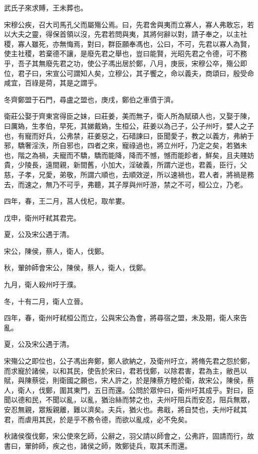 \begin{pinyinscope}
武氏子來求賻，王未葬也。

宋穆公疾，召大司馬孔父而屬殤公焉。曰，先君舍與夷而立寡人，寡人弗敢忘，若以大夫之靈，得保首領以沒，先君若問與夷，其將何辭以對，請子奉之，以主社稷，寡人雖死，亦無悔焉，對曰，群臣願奉馮也，公曰，不可，先君以寡人為賢，使主社稷，若棄德不讓，是廢先君之舉也，豈曰能賢，光昭先君之令德，可不務乎，吾子其無廢先君之功，使公子馮出居於鄭，八月，庚辰，宋穆公卒，殤公即位，君子曰，宋宣公可謂知人矣，立穆公，其子饗之，命以義夫，商頌曰，殷受命咸宜，百祿是荷，其是之謂乎。

冬齊鄭盟于石門，尋盧之盟也，庚戌，鄭伯之車僨于濟。

衛莊公娶于齊東宮得臣之妹，曰莊姜，美而無子，衛人所為賦碩人也，又娶于陳，曰厲媯，生孝伯，早死，其娣戴媯，生桓公，莊姜以為己子，公子州吁，嬖人之子也，有寵而好兵，公弗禁，莊姜惡之，石碏諫曰，臣聞愛子，教之以義方，弗納于邪，驕奢淫泆，所自邪也，四者之來，寵祿過也，將立州吁，乃定之矣，若猶未也，階之為禍，夫寵而不驕，驕而能降，降而不憾，憾而能眕者，鮮矣，且夫賤妨貴，少陵長，遠間親，新間舊，小加大，淫破義，所謂六逆也，君義，臣行，父慈，子孝，兄愛，弟敬，所謂六順也，去順效逆，所以速禍也，君人者，將禍是務去，而速之，無乃不可乎，弗聽，其子厚與州吁游，禁之不可，桓公立，乃老。

四年，春，王二月，莒人伐杞，取牟婁。

戊申，衛州吁弒其君完。

夏，公及宋公遇于清。

宋公，陳侯，蔡人，衛人，伐鄭。

秋，翬帥師會宋公，陳侯，蔡人，衛人，伐鄭。

九月，衛人殺州吁于濮。

冬，十有二月，衛人立晉。

四年，春，衛州吁弒桓公而立，公與宋公為會，將尋宿之盟，未及期，衛人來告亂。

夏，公及宋公遇于清。

宋殤公之即位也，公子馮出奔鄭，鄭人欲納之，及衛州吁立，將脩先君之怨於鄭，而求寵於諸侯，以和其民，使告於宋曰，君若伐鄭，以除君害，君為主，敝邑以賦，與陳蔡從，則衛國之願也，宋人許之，於是陳蔡方睦於衛，故宋公，陳侯，蔡人，衛人，伐鄭，圍其東門，五日而還。公問於眾仲曰，衛州吁其成乎。對曰，臣聞以德和民，不聞以亂，以亂，猶治絲而棼之也，夫州吁阻兵而安忍，阻兵無眾，安忍無親，眾叛親離，難以濟矣。夫兵，猶火也。弗戢，將自焚也，夫州吁弒其君，而虐用其民，於是乎不務令德，而欲以亂成，必不免矣。

秋諸侯復伐鄭，宋公使來乞師，公辭之，羽父請以師會之，公弗許，固請而行，故書曰，翬帥師，疾之也，諸侯之師，敗鄭徒兵，取其禾而還。


\end{pinyinscope}

